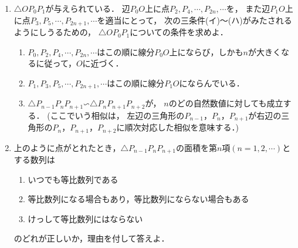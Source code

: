 \documentclass[../../main.tex]{subfiles}
\begin{document}
\begin{enumerate}
  \item[(i)] $\triangle OP_0P_1$が与えられている．
    辺$P_0O$上に点$P_2,P_4,\cdots,P_{2n},\cdots$を，
    また辺$P_1O$上に点$P_3,P_5,\cdots,P_{2n+1},\cdots$を適当にとって，
    次の三条件(イ)〜(ハ)がみたされるようにしうるための，
    $\triangle OP_0P_1$についての条件を求めよ．
    \begin{enumerate}
      \item[(イ)] $P_0,P_2,P_4,\cdots,P_{2n},\cdots$はこの順に線分$P_0O$上にならび，しかも$n$が大きくなるに従って，$O$に近づく．
      \item[(ロ)] $P_1,P_3,P_5,\cdots,P_{2n+1},\cdots$はこの順に線分$P_1O$にならんでいる．
      \item[(ハ)] $\triangle P_{n-1}P_nP_{n+1} \text{∽} \triangle P_nP_{n+1}P_{n+2}$が，
        $n$のどの自然数値に対しても成立する．
        (ここでいう相似は，
        左辺の三角形の$P_{n-1}$，$P_n$，$P_{n+1}$が右辺の三角形の$P_n$，$P_{n+1}$，$P_{n+2}$に順次対応した相似を意味する．)
    \end{enumerate}
  \item[(ii)] 上のように点がとれたとき，$\triangle P_{n-1}P_nP_{n+1}$の面積を第$n$項$(n=1,2,\cdots)$とする数列は
    \begin{enumerate}
      \item[(イ)] いつでも等比数列である
      \item[(ロ)] 等比数列になる場合もあり，等比数列にならない場合もある
      \item[(ハ)] けっして等比数列にはならない
    \end{enumerate}
    のどれが正しいか，理由を付して答えよ．
\end{enumerate}
\end{document}
